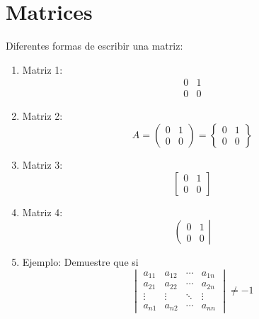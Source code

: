 \documentclass[12pt,letterpaper]{article}
\begin{document}
\section{Matrices}
Diferentes formas de escribir una matriz:
\begin{enumerate}
\item Matriz 1:
\begin{displaymath}
\begin{matrix}
0 & 1\\
0 & 0
\end{matrix}
\end{displaymath}
\item Matriz 2:
\begin{displaymath}
A=
\begin{pmatrix}
0 & 1\\
0 & 0
\end{pmatrix}
=
\begin{Bmatrix}
0 & 1\\
0 & 0
\end{Bmatrix}
\end{displaymath}
\item Matriz 3:
\begin{displaymath}
\begin{bmatrix}
0 & 1\\
0 & 0
\end{bmatrix}
\end{displaymath}
\item Matriz 4:
\begin{displaymath}
\left (
\begin{matrix}
0 & 1\\
0 & 0
\end{matrix}
\right |
\end{displaymath}
\item Ejemplo: Demuestre que si
\begin{displaymath}
\begin{vmatrix}
a_{11} & a_{12} & \cdots & a_{1n}\\
a_{21} & a_{22} & \cdots & a_{2n}\\
\vdots & \vdots & \ddots &\vdots \\
a_{n1} & a_{n2} & \cdots & a_{nn}
\end{vmatrix}\neq -1
\end{displaymath}
\end{enumerate}
\newpage
\end{document}
